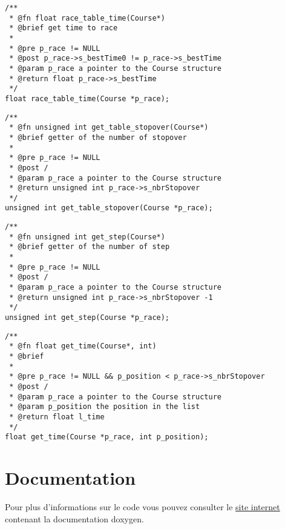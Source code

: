 \documentclass[a4paper, 11pt, oneside]{article}
\begin{document}
		\begin{lstlisting}
/**
 * @fn float race_table_time(Course*)
 * @brief get time to race
 *
 * @pre p_race != NULL
 * @post p_race->s_bestTime0 != p_race->s_bestTime
 * @param p_race a pointer to the Course structure
 * @return float p_race->s_bestTime
 */
float race_table_time(Course *p_race);
		\end{lstlisting}
		
		\begin{lstlisting}
/**
 * @fn unsigned int get_table_stopover(Course*)
 * @brief getter of the number of stopover
 *
 * @pre p_race != NULL
 * @post /
 * @param p_race a pointer to the Course structure
 * @return unsigned int p_race->s_nbrStopover
 */
unsigned int get_table_stopover(Course *p_race);
		\end{lstlisting}
		
		\begin{lstlisting}
/**
 * @fn unsigned int get_step(Course*)
 * @brief getter of the number of step
 *
 * @pre p_race != NULL
 * @post /
 * @param p_race a pointer to the Course structure
 * @return unsigned int p_race->s_nbrStopover -1
 */
unsigned int get_step(Course *p_race);
		\end{lstlisting}
		
		\begin{lstlisting}
/**
 * @fn float get_time(Course*, int)
 * @brief
 *
 * @pre p_race != NULL && p_position < p_race->s_nbrStopover
 * @post /
 * @param p_race a pointer to the Course structure
 * @param p_position the position in the list
 * @return float l_time
 */
float get_time(Course *p_race, int p_position);
		\end{lstlisting}
		
\section{Documentation}	
	Pour plus d'informations sur le code vous pouvez consulter le \href{doc/html/index.html}{site internet} contenant la documentation doxygen.
\end{document}
